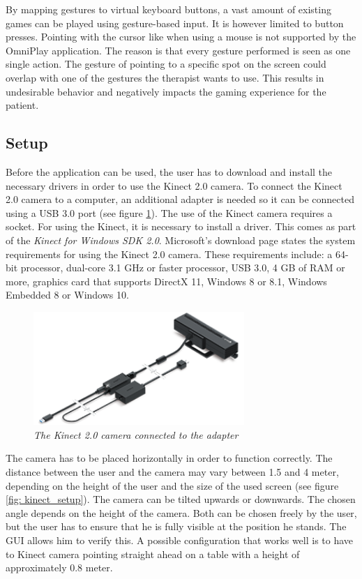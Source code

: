 By mapping gestures to virtual keyboard buttons, a vast amount of existing games can be played using gesture-based input. It is however limited to button presses. Pointing with the cursor like when using a mouse is not supported by the OmniPlay application. The reason is that every gesture performed is seen as one single action. The gesture of pointing to a specific spot on the screen could overlap with one of the gestures the therapist wants to use. This results in undesirable behavior and negatively impacts the gaming experience for the patient.


\subsection{Setup}

Before the application can be used, the user has to download and install the necessary drivers in order to use the Kinect 2.0 camera. To connect the Kinect 2.0 camera to a computer, an additional adapter is needed so it can be connected using a USB 3.0 port (see figure \ref{fig: kinect}). The use of the Kinect camera requires a socket. For using the Kinect, it is necessary to install a driver. This comes as part of the \emph{Kinect for Windows SDK 2.0}. Microsoft's download page \cite{KinectSDK} states the system requirements for using the Kinect 2.0 camera. These requirements include: a 64-bit processor, dual-core 3.1 GHz or faster processor, USB 3.0, 4 GB of RAM or more, graphics card that supports DirectX 11, Windows 8 or 8.1, Windows Embedded 8 or Windows 10.\\

\begin{figure}[H]
\begin{center}
\includegraphics[width=8cm]{KinectAdapter.png}
\caption{\emph{The Kinect 2.0 camera connected to the adapter}}
\label{fig: kinect}
\end{center}
\end{figure}

The camera has to be placed horizontally in order to function correctly. The distance between the user and the camera may vary between 1.5 and 4 meter, depending on the height of the user and the size of the used screen (see figure \ref{fig: kinect_setup}). The camera can be tilted upwards or downwards. The chosen angle depends on the height of the camera. Both can be chosen freely by the user, but the user has to ensure that he is fully visible at the position he stands. The GUI allows him to verify this. A possible configuration that works well is to have to Kinect camera pointing straight ahead on a table with a height of approximately 0.8 meter.\\

